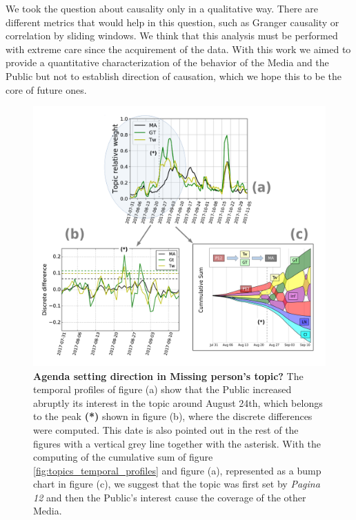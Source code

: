 \documentclass[a4paper, 12pt]{article}
\begin{document}
\par We took the question about causality only in a qualitative way. 
There are different metrics that would help in this question, such as Granger causality or correlation by sliding windows. We think that this analysis must be performed with extreme care since the acquirement of the data.
With this work we aimed to provide a quantitative characterization of the behavior of the Media and the Public but not to establish direction of causation, which we hope this to be the core of future ones.


\begin{figure}
\includegraphics[width = \textwidth]{images/Fig8.pdf}
\caption{\textbf{Agenda setting direction in Missing person's topic?}
The temporal profiles of figure (a) show that the Public increased abruptly its interest in the topic around August 24th, which belongs to the peak \textbf{(*)} shown in figure (b), where the discrete differences were computed. 
This date is also pointed out in the rest of the figures with a vertical grey line together with the asterisk. 
With the computing of the cumulative sum of figure \ref{fig:topics_temporal_profiles} and figure (a), represented as a bump chart in figure (c), we suggest that the topic was first set by \emph{Pagina 12} and then the Public's interest cause the coverage of the other Media.
}
\label{fig:Maldonado_setagenda}
\end{figure}

%
\end{document}

